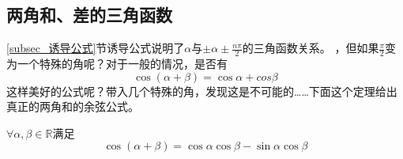 \subsection{两角和、差的三角函数}
    \ref{subsec_诱导公式}节诱导公式说明了$\alpha$与$\pm \alpha \pm \frac{n\pi}{2}$的三角函数关系。
    ，但如果\(\frac{\pi}{2}\)变为一个特殊的角呢？对于一般的情况，是否有
    \[\cos(\alpha+\beta) = \cos \alpha+cos \beta\]
    这样美好的公式呢？带入几个特殊的角，发现这是不可能的……下面这个定理给出真正的两角和的余弦公式。
\begin{theorem}[两角和的余弦]\label{两角和余弦定理}
    $\forall \alpha,\beta \in \mathbb{R} $满足
    \begin{equation}
        \cos(\alpha+\beta) = \cos \alpha\cos \beta -\sin \alpha\cos \beta  
    \end{equation}
\end{theorem}
